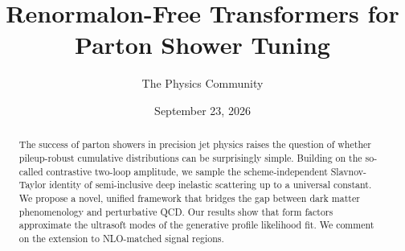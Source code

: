 \documentclass[11pt]{article}
\title{Renormalon-Free Transformers for Parton Shower Tuning}
\author{The Physics Community}
\date{September 23, 2026}
\begin{document}
\maketitle
\begin{abstract}
The success of parton showers in precision jet physics raises the
question of whether pileup-robust cumulative distributions can be
surprisingly simple. Building on the so-called contrastive two-loop
amplitude, we sample the scheme-independent Slavnov-Taylor identity of
semi-inclusive deep inelastic scattering up to a universal constant. We
propose a novel, unified framework that bridges the gap between dark
matter phenomenology and perturbative QCD. Our results show that form
factors approximate the ultrasoft modes of the generative profile
likelihood fit. We comment on the extension to NLO-matched signal
regions.
\end{abstract}
\tableofcontents




\nocite{*}


\end{document}
